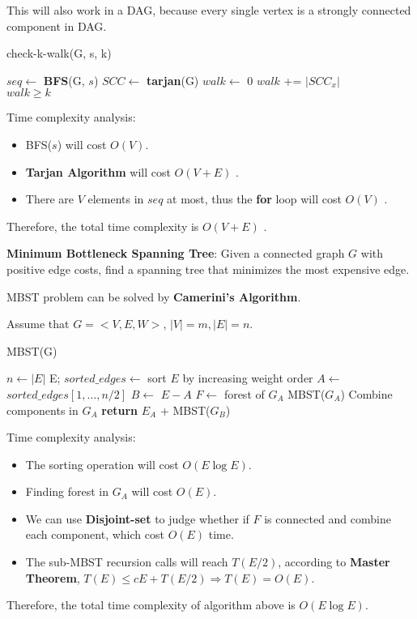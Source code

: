 \documentclass{article}
\newcounter{exercise}
\newcommand{\<}{
    \langle}
\renewcommand{\>}{
    \rangle}
\begin{document}
{This will also work in a DAG, because every single vertex is a strongly connected component in DAG.


\begin{algorithm}[htb]
\caption{check-k-walk(G, s, k)}
\begin{algorithmic}[1]
\State $seq \leftarrow$ \textbf{BFS}(G, $s$)
\State $SCC \leftarrow$ \textbf{tarjan}(G)
\State $walk \leftarrow$ 0
    \State $walk$ += $|SCC_x|$
\EndFor \\
\Return $walk \ge k$
\end{algorithmic}
\end{algorithm}

Time complexity analysis:
\begin{itemize}
    \item BFS($s$) will cost $O(V)$.
    \item \textbf{Tarjan Algorithm} will cost $O(V+E)$ .
    \item There are $V$ elements in $seq$ at most, thus the \textbf{for} loop will cost $O(V)$ .
\end{itemize}

Therefore, the total time complexity is $O(V+E)$ .


\begin{exercise}
\textbf{Minimum Bottleneck Spanning Tree}: Given a connected graph $ G $ with positive edge costs, find a
spanning tree that {minimizes the most expensive edge}.
\end{exercise}

MBST problem can be solved by \textbf{Camerini's Algorithm}.

Assume that $G=<V, E, W>$, $|V| = m, |E| = n$.

\begin{algorithm}[htb]
\caption{MBST(G)}
\begin{algorithmic}[1]
\State $n \leftarrow |E|$
    \Return E;
\Else 
    \State $sorted\_edges \leftarrow $ sort $E$ by increasing weight order
    \State $A \leftarrow$ $sorted\_edges[1, \dots, n/2]$
    \State $B \leftarrow$ $E-A$
    \State $F \leftarrow$ forest of $G_A$
        \Return MBST($G_A$)
    \Else
        \State Combine components in $G_A$
        \State \textbf{return} $E_A$ + MBST($G_B$)
    \EndIf
\EndIf
\end{algorithmic}
\end{algorithm}

Time complexity analysis:
\begin{itemize}
    \item The sorting operation will cost $O(E\log{E})$.
    \item Finding forest in $G_A$ will cost $O(E)$.
    \item We can use \textbf{Disjoint-set} to judge whether if $F$ is connected and combine each component, which cost $O(E)$ time.
    \item The sub-MBST recursion calls will reach $T(E/2)$, according to \textbf{Master Theorem}, $T(E) \le cE + T(E/2) \Rightarrow T(E) = O(E)$.
\end{itemize}

Therefore, the total time complexity of algorithm above is $O(E\log{E})$.

} %
\end{document}
